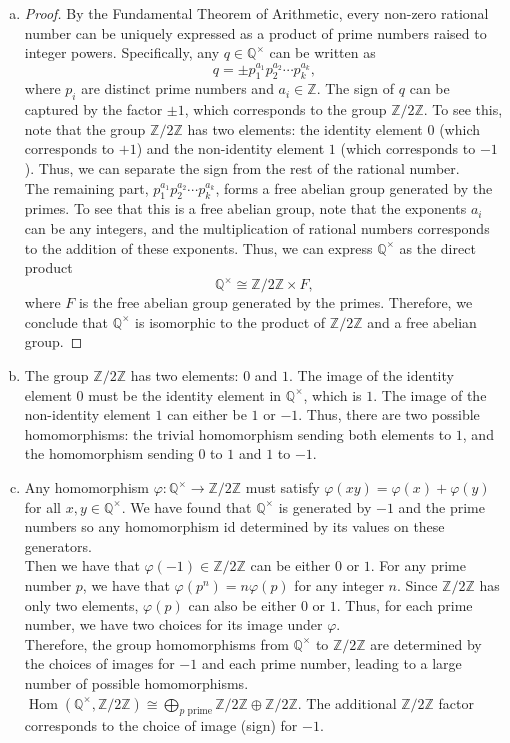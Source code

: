 \documentclass{article}
\def\zz{{\mathbb Z}}
\def\qq{{\mathbb Q}}
\begin{document}
\begin{enumerate}[(a)]
    \item \begin{proof}
        By the Fundamental Theorem of Arithmetic, every non-zero rational number can be uniquely expressed as a product of prime numbers raised to integer powers. Specifically, any $q \in \qq^\times$ can be written as
        \[
            q = \pm p_1^{a_1} p_2^{a_2} \cdots p_k^{a_k},
        \]
        where $p_i$ are distinct prime numbers and $a_i \in \zz$. The sign of $q$ can be captured by the factor $\pm 1$, which corresponds to the group $\zz/2\zz$. To see this, note that the group $\zz/2\zz$ has two elements: the identity element $0$ (which corresponds to $+1$) and the non-identity element $1$ (which corresponds to $-1$). Thus, we can separate the sign from the rest of the rational number. \\
        The remaining part, $p_1^{a_1} p_2^{a_2} \cdots p_k^{a_k}$, forms a free abelian group generated by the primes. To see that this is a free abelian group, note that the exponents $a_i$ can be any integers, and the multiplication of rational numbers corresponds to the addition of these exponents. Thus, we can express $\qq^\times$ as the direct product
        \[
            \qq^\times \cong \zz/2\zz \times F,
        \]
        where $F$ is the free abelian group generated by the primes. Therefore, we conclude that $\qq^\times$ is isomorphic to the product of $\zz/2\zz$ and a free abelian group.
    \end{proof}
    \item The group $\zz/2\zz$ has two elements: $0$ and $1$. The image of the identity element $0$ must be the identity element in $\qq^\times$, which is $1$. The image of the non-identity element $1$ can either be $1$ or $-1$. Thus, there are two possible homomorphisms: the trivial homomorphism sending both elements to $1$, and the homomorphism sending $0$ to $1$ and $1$ to $-1$.
    \item Any homomorphism $\varphi : \qq^\times \to \zz/2\zz$ must satisfy $\varphi(xy) = \varphi(x) + \varphi(y)$ for all $x, y \in \qq^\times$. We have found that $\qq^\times$ is generated by $-1$ and the prime numbers so any homomorphism id determined by its values on these generators. \\
    Then we have that $\varphi(-1) \in \zz/2\zz$ can be either $0$ or $1$. For any prime number $p$, we have that $\varphi(p^n) = n \varphi(p)$ for any integer $n$. Since $\zz/2\zz$ has only two elements, $\varphi(p)$ can also be either $0$ or $1$. Thus, for each prime number, we have two choices for its image under $\varphi$. \\
    Therefore, the group homomorphisms from $\qq^\times$ to $\zz/2\zz$ are determined by the choices of images for $-1$ and each prime number, leading to a large number of possible homomorphisms. $\operatorname{Hom}(\qq^\times, \zz/2\zz) \cong \bigoplus_{p \text{ prime}} \zz/2\zz \oplus \zz/2\zz$. The additional $\zz/2\zz$ factor corresponds to the choice of image (sign) for $-1$.
\end{enumerate}
\end{document}
